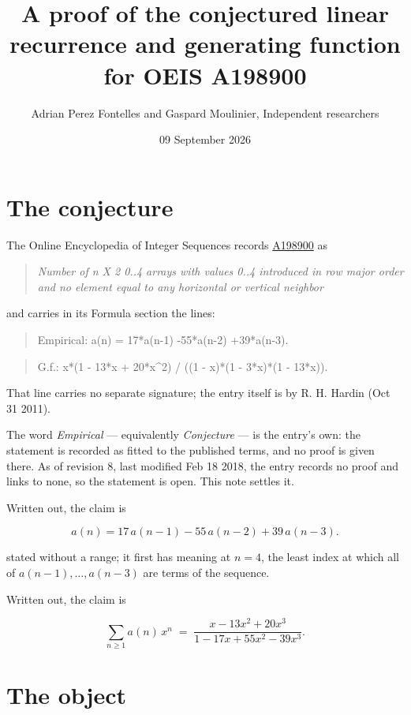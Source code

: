 \documentclass[11pt]{article}
\title{A proof of the conjectured linear recurrence and generating function for OEIS A198900}
\author{Adrian Perez Fontelles and Gaspard Moulinier, Independent researchers}
\date{09 September 2026}
\theoremstyle{definition}
\begin{document}
\maketitle
\section{The conjecture}

The Online Encyclopedia of Integer Sequences records \href{https://oeis.org/A198900}{A198900} as

\begin{quote}\itshape Number of n X 2 0..4 arrays with values 0..4 introduced in row major order and no element equal to any horizontal or vertical neighbor\end{quote}

and carries in its Formula section the lines:

\begin{quote}\ttfamily Empirical: a(n) = 17*a(n-1) -55*a(n-2) +39*a(n-3).\end{quote}

\begin{quote}\ttfamily G.f.: x*(1 - 13*x + 20*x\textasciicircum{}2) / ((1 - x)*(1 - 3*x)*(1 - 13*x)).\end{quote}

That line carries no separate signature; the entry itself is by R. H. Hardin (Oct 31 2011).

The word {\itshape Empirical} --- equivalently {\itshape Conjecture} --- is the entry's own: the statement is recorded as fitted to the published terms, and no proof is given there. As of revision 8, last modified Feb 18 2018, the entry records no proof and links to none, so the statement is open. This note settles it.

Written out, the claim is

\[a(n) = 17\,a(n-1) - 55\,a(n-2) + 39\,a(n-3).\]

stated without a range; it first has meaning at $n = 4$, the least index at which all of $a(n-1),\dots,a(n-3)$ are terms of the sequence.

Written out, the claim is

\[\sum_{n \ge 1} a(n)\,x^n \;=\; \frac{x - 13x^{2} + 20x^{3}}{1 - 17x + 55x^{2} - 39x^{3}}.\]

\section{The object}
\end{document}
